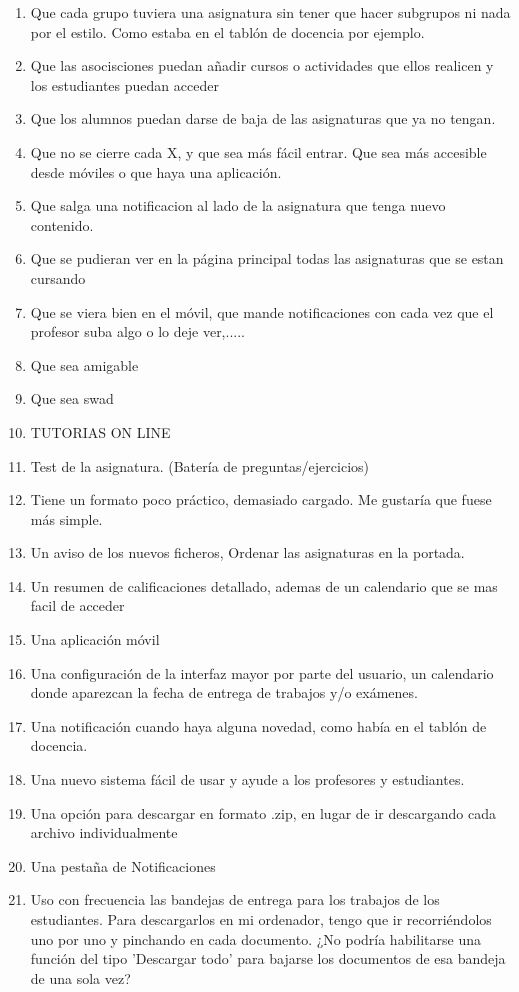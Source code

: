 \begin{enumerate}
\item Que cada grupo tuviera una asignatura sin tener que hacer subgrupos ni nada por el estilo. Como estaba en el tablón de docencia por ejemplo.
\item Que las asocisciones puedan añadir cursos o actividades que ellos realicen y los estudiantes puedan acceder
\item Que los alumnos puedan darse de baja de las asignaturas que ya no tengan.
\item Que no se cierre cada X, y que sea más fácil entrar. Que sea más accesible desde móviles o que haya una aplicación.
\item Que salga una notificacion al lado de la asignatura que tenga nuevo contenido.
\item Que se pudieran ver en la página principal todas las asignaturas que se estan cursando
\item Que se viera bien en el móvil, que mande notificaciones con cada vez que el profesor suba algo o lo deje ver,.....
\item Que sea amigable
\item Que sea swad
\item TUTORIAS ON LINE
\item Test de la asignatura. (Batería de preguntas/ejercicios)
\item Tiene un formato poco práctico, demasiado cargado. Me gustaría que fuese más simple.
\item Un aviso de los nuevos ficheros, Ordenar las asignaturas en la portada.
\item Un resumen de calificaciones detallado, ademas de un calendario que se mas facil de acceder
\item Una aplicación móvil
\item Una configuración de la interfaz mayor por parte del usuario, un calendario donde aparezcan la fecha de entrega de trabajos y/o exámenes.
\item Una notificación cuando haya alguna novedad, como había en el tablón de docencia.
\item Una nuevo sistema fácil de usar y ayude a los profesores y estudiantes.
\item Una opción para descargar en formato .zip, en lugar de ir descargando cada archivo individualmente
\item Una pestaña de Notificaciones
\item Uso con frecuencia las bandejas de entrega para los trabajos de los estudiantes. Para descargarlos en mi ordenador, tengo que ir recorriéndolos uno por uno y pinchando en cada documento. ¿No podría habilitarse una función del tipo 'Descargar todo' para bajarse los documentos de esa bandeja de una sola vez?

\end{enumerate}
